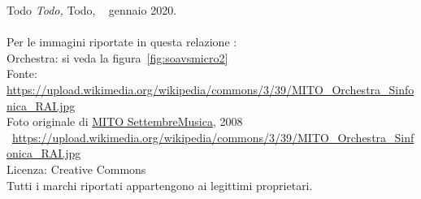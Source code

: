 \hfill
\vfill
\noindent Todo \textit{Todo,} Todo, \textrm{\textcopyright}~ gennaio 2020.\\\\

\noindent Per le immagini riportate in questa relazione :\\

\noindent Orchestra: si veda la figura~\vref{fig:soavsmicro2}\\
\noindent Fonte: \url{https://upload.wikimedia.org/wikipedia/commons/3/39/MITO_Orchestra_Sinfonica_RAI.jpg}\\
\noindent Foto originale di \href{https://www.flickr.com/photos/28437914@N03}{MITO SettembreMusica}, 2008\\
\noindent \textrm{\textcopyright}~\url{https://upload.wikimedia.org/wikipedia/commons/3/39/MITO_Orchestra_Sinfonica_RAI.jpg}\\
\noindent Licenza: Creative Commons\\

\noindent Tutti i marchi riportati appartengono ai legittimi proprietari.